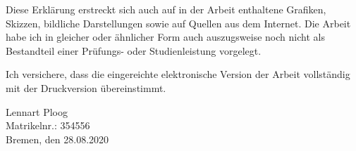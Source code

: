 \documentclass[a4paper, 12pt]{scrreprt}
\begin{document}
	Diese Erklärung erstreckt sich auch auf in der Arbeit enthaltene Grafiken, Skizzen, bildliche Darstellungen sowie auf Quellen aus dem Internet.
	Die Arbeit habe ich in gleicher oder ähnlicher Form auch auszugsweise noch nicht als Bestandteil einer Prüfungs- oder Studienleistung vorgelegt. 
	
	Ich versichere, dass die eingereichte elektronische Version der Arbeit vollständig mit der Druckversion übereinstimmt.
	
	Lennart Ploog \\
	Matrikelnr.: 354556\\
	Bremen, den 28.08.2020\\
\end{document}
